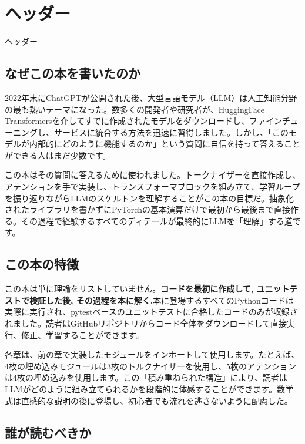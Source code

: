 
\chapter*{ヘッダー}
 {ヘッダー}

\section*{なぜこの本を書いたのか}

2022年末にChatGPTが公開された後、大型言語モデル（LLM）は人工知能分野の最も熱いテーマになった。数多くの開発者や研究者が、HuggingFace Transformersを介してすでに作成されたモデルをダウンロードし、ファインチューニングし、サービスに統合する方法を迅速に習得しました。しかし、「このモデルが内部的にどのように機能するのか」という質問に自信を持って答えることができる人はまだ少数です。

この本はその質問に答えるために使われました。トークナイザーを直接作成し、アテンションを手で実装し、トランスフォーマブロックを組み立て、学習ループを振り返りながらLLMのスケルトンを理解することがこの本の目標だ。抽象化されたライブラリを書かずにPyTorchの基本演算だけで最初から最後まで直接作る。その過程で経験するすべてのディテールが最終的にLLMを「理解」する道です。

\section*{この本の特徴}

この本は単に理論をリストしていません。\textbf{コードを最初に作成して, ユニットテストで検証した後, その過程を本に解く.}本に登場するすべてのPythonコードは実際に実行され、pytestベースのユニットテストに合格したコードのみが収録されました。読者はGitHubリポジトリからコード全体をダウンロードして直接実行、修正、学習することができます。

各章は、前の章で実装したモジュールをインポートして使用します。たとえば、4枚の埋め込みモジュールは3枚のトルクナイザーを使用し、5枚のアテンションは4枚の埋め込みを使用します。この「積み重ねられた構造」により、読者はLLMがどのように組み立てられるかを段階的に体感することができます。数学式は直感的な説明の後に登場し、初心者でも流れを逃さないように配慮した。

\section*{誰が読むべきか}

